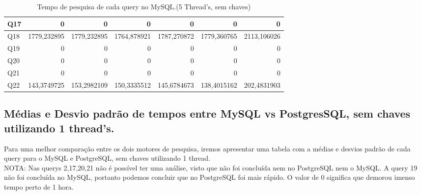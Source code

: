 \documentclass{article}
\begin{document}
\begin{table}[H]
{\begin{tabular}{|l|r|r|r|r|r|r|}
        Q17	&0&	0	&0	&0&	0&	0 \\ \hline
        Q18	&1779,232895	&1779,232895&	1764,878921&	1787,270872	&1779,360765&	2113,106026 \\ \hline
        Q19	&0&	0	&0	&0&	0&	0 \\ \hline
        Q20	&0&	0	&0	&0&	0&	0 \\ \hline
        Q21	&0&	0	&0	&0&	0&	0 \\ \hline
        Q22	&143,3749725&	153,2982109	&150,3335512	&145,6784673&	138,4015162&	202,4831903 \\ \hline \end{tabular}}
    \caption{Tempo de pesquisa de cada query no MySQL.(5 Thread's, sem chaves)}
    \label{tab:BC_Table3}
  \end{table}


\clearpage
\subsection{Médias e Desvio padrão de tempos entre MySQL vs PostgresSQL, sem chaves utilizando 1 thread's.}

  \texttt{}\par Para uma melhor comparação entre os dois motores de pesquisa, iremos apresentar uma tabela com a médias e desvios padrão de cada query para o MySQL e PostgreSQL, sem chaves utilizando 1 thread. \\
NOTA: Nas querys 2,17,20,21 não é possível ter uma análise, visto que não foi concluída nem no PostgreSQL nem o MySQL. A query 19 não foi concluída no MySQL, portanto podemos concluir que no PostgreSQL foi mais rápido. O valor de 0 significa que demorou imenso tempo perto de 1 hora.
\end{document}
